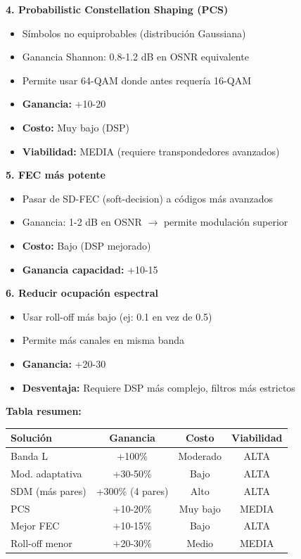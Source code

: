 \documentclass[a4paper,10pt]{article}
\begin{document}
\textbf{4. Probabilistic Constellation Shaping (PCS)}
\begin{itemize}
    \item Símbolos no equiprobables (distribución Gaussiana)
    \item Ganancia Shannon: 0.8-1.2 dB en OSNR equivalente
    \item Permite usar 64-QAM donde antes requería 16-QAM
    \item \textbf{Ganancia:} +10-20%
    \item \textbf{Costo:} Muy bajo (DSP)
    \item \textbf{Viabilidad:} MEDIA (requiere transpondedores avanzados)
\end{itemize}

\textbf{5. FEC más potente}
\begin{itemize}
    \item Pasar de SD-FEC (soft-decision) a códigos más avanzados
    \item Ganancia: 1-2 dB en OSNR $\rightarrow$ permite modulación superior
    \item \textbf{Costo:} Bajo (DSP mejorado)
    \item \textbf{Ganancia capacidad:} +10-15%
\end{itemize}

\textbf{6. Reducir ocupación espectral}
\begin{itemize}
    \item Usar roll-off más bajo (ej: 0.1 en vez de 0.5)
    \item Permite más canales en misma banda
    \item \textbf{Ganancia:} +20-30%
    \item \textbf{Desventaja:} Requiere DSP más complejo, filtros más estrictos
\end{itemize}

\textbf{Tabla resumen:}
\begin{center}
\begin{tabular}{lccc}
\toprule
\textbf{Solución} & \textbf{Ganancia} & \textbf{Costo} & \textbf{Viabilidad} \\
\midrule
Banda L & +100\% & Moderado & ALTA \\
Mod. adaptativa & +30-50\% & Bajo & ALTA \\
SDM (más pares) & +300\% (4 pares) & Alto & ALTA \\
PCS & +10-20\% & Muy bajo & MEDIA \\
Mejor FEC & +10-15\% & Bajo & ALTA \\
Roll-off menor & +20-30\% & Medio & MEDIA \\
\bottomrule
\end{tabular}
\end{center}
\end{document}
